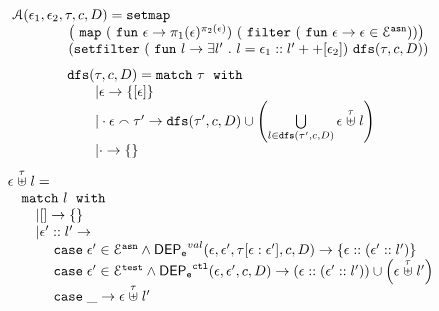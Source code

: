 \begin{defn}
\[
\begin{array}{l}
	\mathcal{A}(\event_1, \event_2, \trace, c, D)
	= 
	\kw{setmap} ~
	\\ \qquad \qquad
	\left(\emap 
		(\efun  \event \to \pi_1(\event)^{\pi_2(\event)})	
	~
	(\efilter 
		(\efun \event \to  \event \in \eventset^{\asn})) \right)
	\\ \qquad \qquad
	(\kw{setfilter} ~
		(\efun l \to \exists l' \st l = \event_1 :: l' ++ [\event_2]) ~ \kw{dfs}(\trace, c, D))
	\end{array}
\]
%
%
\[
\begin{array}{l}
	\kw{dfs}(\trace, c, D)
	= 
	\ematch~  \trace ~ \ewith
	\\ \qquad
	| \event \to \{[\event]\}
	\\ \qquad
	|  \cdot \event \tracecat \trace' \to  
	\kw{dfs}(\trace', c, D)
	\cup 
	\left(   \bigcup\limits_{l \in \kw{dfs}(\trace', c, D) }
	\event \stackrel{\trace}{\uplus} l 
	\right)
	\\ \qquad
	| \cdot \to \{\}
\end{array}
\]
%
%
\[
\begin{array}{l}
	\event \stackrel{\trace}{\uplus} l
	= 
	\\ \quad
	\ematch~  l ~ \ewith
	\\ \qquad
	| [] \to \{\}
	\\ \qquad
	|  \event' :: l' \to  
	\\ \quad \qquad 	
	\ecase \event' \in \eventset^{\asn}  \land \eventdep^{val}(\event, \event', \trace[\event:\event'], c, D)
	\to \left\{ \event::(\event' :: l') \right\}
	\\ \quad \qquad 	
	\ecase \event' \in \eventset^{\test} \land \eventdep^{\ctl}(\event, \event', c, D)
	\to (\event::(\event' :: l')) \cup \left( \event \stackrel{\trace}{\uplus} l' \right)
	\\ \quad \qquad 	
	\ecase \_ \to \event \stackrel{\trace}{\uplus} l' 
\end{array}
\]
\end{defn}
